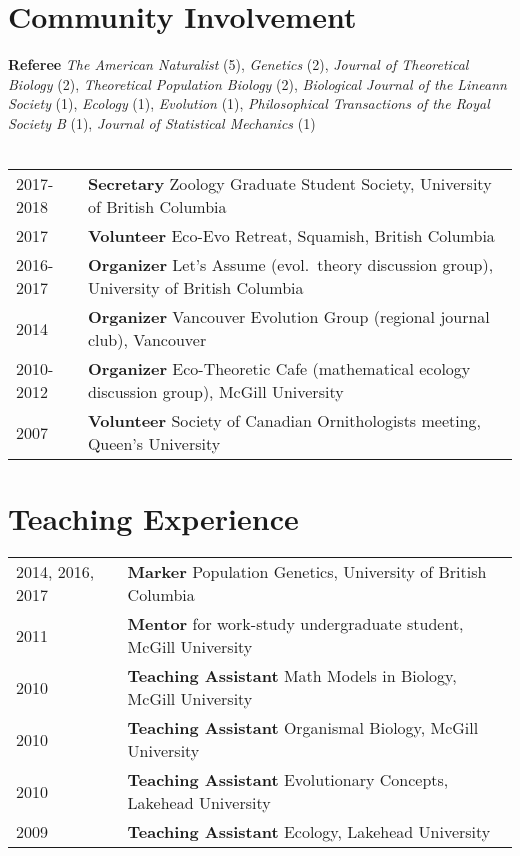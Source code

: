 \documentclass[12pt]{article}
\begin{document}
\section*{Community Involvement}

\noindent \textbf{Referee} \textit{The American Naturalist} (5), \textit{Genetics} (2), \textit{Journal of Theoretical Biology} (2), \textit{Theoretical Population Biology} (2), \textit{Biological Journal of the Lineann Society} (1), \textit{Ecology} (1), \textit{Evolution} (1), \textit{Philosophical Transactions of the Royal Society B} (1), \textit{Journal of Statistical Mechanics} (1) \\\\
\begin{tabular}{ll}
2017-2018 & \textbf{Secretary} Zoology Graduate Student Society, University of British Columbia \\
2017 & \textbf{Volunteer} Eco-Evo Retreat, Squamish, British Columbia \\
2016-2017 & \textbf{Organizer} Let's Assume (evol.\ theory discussion group), University of British Columbia \\
2014 & \textbf{Organizer} Vancouver Evolution Group (regional journal club), Vancouver \\
2010-2012 & \textbf{Organizer} Eco-Theoretic Cafe (mathematical ecology discussion group), McGill University \\
2007 & \textbf{Volunteer} Society of Canadian Ornithologists meeting,  Queen's University
\end{tabular}

\section*{Teaching Experience}

\begin{tabular}{ll}
2014, 2016, 2017 & \textbf{Marker} Population Genetics, University of British Columbia \\
2011 & \textbf{Mentor} for work-study undergraduate student, McGill University \\
2010 & \textbf{Teaching Assistant} Math Models in Biology, McGill University \\
2010 & \textbf{Teaching Assistant} Organismal Biology, McGill University\\
2010 &  \textbf{Teaching Assistant} Evolutionary Concepts, Lakehead University\\
2009 &  \textbf{Teaching Assistant} Ecology, Lakehead University
\end{tabular}
\end{document}
